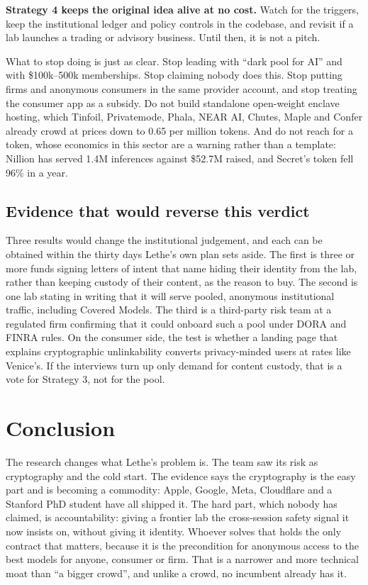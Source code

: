 \documentclass[10pt,a4paper]{article}
\begin{document}
\textbf{Strategy 4 keeps the original idea alive at no cost.} Watch for the triggers, keep the institutional ledger and policy controls in the codebase, and revisit if a lab launches a trading or advisory business. Until then, it is not a pitch.

What to stop doing is just as clear. Stop leading with ``dark pool for AI'' and with \$100k--500k memberships. Stop claiming nobody does this. Stop putting firms and anonymous consumers in the same provider account, and stop treating the consumer app as a subsidy. Do not build standalone open-weight enclave hosting, which Tinfoil, Privatemode, Phala, NEAR AI, Chutes, Maple and Confer already crowd at prices down to \texteuro{}0.65 per million tokens. And do not reach for a token, whose economics in this sector are a warning rather than a template: Nillion has served 1.4M inferences against \$52.7M raised, and Secret's token fell 96\% in a year.

\subsection{Evidence that would reverse this verdict}

Three results would change the institutional judgement, and each can be obtained within the thirty days Lethe's own plan sets aside. The first is three or more funds signing letters of intent that name hiding their identity from the lab, rather than keeping custody of their content, as the reason to buy. The second is one lab stating in writing that it will serve pooled, anonymous institutional traffic, including Covered Models. The third is a third-party risk team at a regulated firm confirming that it could onboard such a pool under DORA and FINRA rules. On the consumer side, the test is whether a landing page that explains cryptographic unlinkability converts privacy-minded users at rates like Venice's. If the interviews turn up only demand for content custody, that is a vote for Strategy 3, not for the pool.

\section{Conclusion}

The research changes what Lethe's problem is. The team saw its risk as cryptography and the cold start. The evidence says the cryptography is the easy part and is becoming a commodity: Apple, Google, Meta, Cloudflare and a Stanford PhD student have all shipped it. The hard part, which nobody has claimed, is accountability: giving a frontier lab the cross-session safety signal it now insists on, without giving it identity. Whoever solves that holds the only contract that matters, because it is the precondition for anonymous access to the best models for anyone, consumer or firm. That is a narrower and more technical moat than ``a bigger crowd'', and unlike a crowd, no incumbent already has it.
\end{document}
